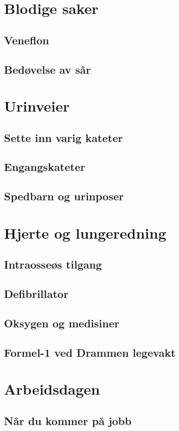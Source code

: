 \documentclass[a4paper,12pt,twoside]{memoir}
\begin{document}
			\chapter{Blodige saker}
				\section{Veneflon}
				\section{Bedøvelse av sår}
			\chapter{Urinveier}
				\section{Sette inn varig kateter}
				\section{Engangskateter}
				\section{Spedbarn og urinposer}
			\chapter{Hjerte og lungeredning}
				\section{Intraosseøs tilgang}
				\section{Defibrillator}
				\section{Oksygen og medisiner}
				\section{Formel-1 ved Drammen legevakt}
			\chapter{Arbeidsdagen}
				\section{Når du kommer på jobb}
\end{document}
